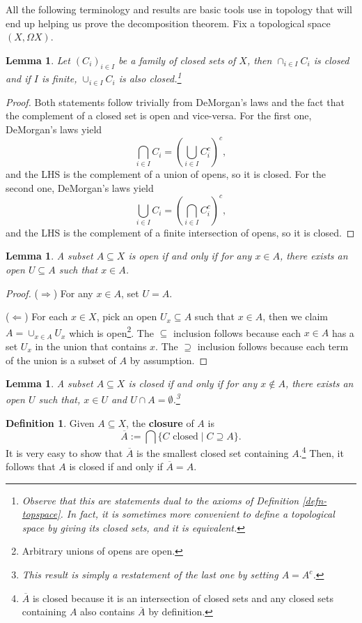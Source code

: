 \documentclass{tufte-handout} %
\newtheorem{lem}[thm]{Lemma}
\theoremstyle{definition}
\newtheorem{defn}[thm]{Definition}
\theoremstyle{remark}
\newcommand{\bra}[1]{\left(#1\right)}
\newcommand{\0}{\textsf{0}}
\newcommand{\1}{\textsf{1}}
\begin{document}
All the following terminology and results are basic tools use in topology that will end up helping us prove the decomposition theorem. Fix a topological space $(X,\Omega X)$.
\begin{lem}
	Let $(C_i)_{i \in I}$ be a family of closed sets of $X$, then $\cap_{i \in I} C_i$ is closed and if $I$ is finite, $\cup_{i \in I} C_i$ is also closed.\footnote{Observe that this are statements dual to the axioms of Definition \ref{defn-topspace}. In fact, it is sometimes more convenient to define a topological space by giving its closed sets, and it is equivalent.}
\end{lem}
\begin{proof}
	Both statements follow trivially from DeMorgan's laws and the fact that the complement of a closed set is open and vice-versa. For the first one, DeMorgan's laws yield
	\[\bigcap_{i \in I} C_i =  \bra{\bigcup_{i \in I} C_i^c}^c,\]
	and the LHS is the complement of a union of opens, so it is closed. For the second one, DeMorgan's laws yield
	\[\bigcup_{i \in I} C_i =  \bra{\bigcap_{i \in I} C_i^c}^c,\]
	and the LHS is the complement of a finite intersection of opens, so it is closed.
\end{proof}
\begin{lem}\label{lem-openchar}
	A subset $A \subseteq X$ is open if and only if for any $x \in A$, there exists an open $U \subseteq A$ such that $x \in A$.
\end{lem}
\begin{proof}
	($\Rightarrow$) For any $x \in A$, set $U = A$.
	
	($\Leftarrow$) For each $x \in X$, pick an open $U_x \subseteq A$ such that $x \in A$, then we claim $A = \cup_{x \in A} U_x$ which is open\footnote{Arbitrary unions of opens are open.}. The $\subseteq$ inclusion follows because each $x \in A$ has a set $U_x$ in the union that contains $x$. The $\supseteq$ inclusion follows because each term of the union is a subset of $A$ by assumption.
\end{proof}
\begin{lem}\label{lem-closedchar}
	A subset $A\subseteq X$ is closed if and only if for any $x \notin A$, there exists an open $U$ such that, $x \in U$ and $U\cap A = \emptyset$.\footnote{This result is simply a restatement of the last one by setting $A = A^c$.}
\end{lem}
\begin{defn}
	Given $A \subseteq X$, the \textbf{closure} of $A$ is \[\overline{A} := \bigcap \{C \text{ closed}\mid C \supseteq A \}.\]
	It is very easy to show that $\overline{A}$ is the smallest closed set containing $A$.\footnote{$\overline{A}$ is closed because it is an intersection of closed sets and any closed sets containing $A$ also contains $\overline{A}$ by definition.} Then, it follows that $A$ is closed if and only if $\overline{A} = A$.
\end{defn}
\end{document}
